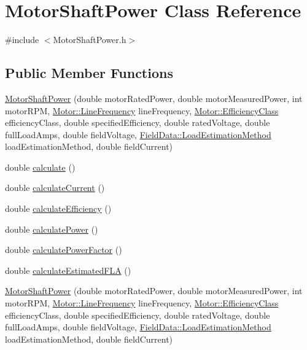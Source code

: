 \hypertarget{class_motor_shaft_power}{}\section{Motor\+Shaft\+Power Class Reference}
\label{class_motor_shaft_power}


{\ttfamily \#include $<$Motor\+Shaft\+Power.\+h$>$}

\subsection*{Public Member Functions}
\begin{DoxyCompactItemize}
\item 
\hyperlink{class_motor_shaft_power_a1695ae98d73b9813f2c049f627cc87f5}{Motor\+Shaft\+Power} (double motor\+Rated\+Power, double motor\+Measured\+Power, int motor\+R\+PM, \hyperlink{class_motor_acee1bdf1b684ad36cb80dc2829d9fcee}{Motor\+::\+Line\+Frequency} line\+Frequency, \hyperlink{class_motor_afa022971ae062406a9f588c601673d4e}{Motor\+::\+Efficiency\+Class} efficiency\+Class, double specified\+Efficiency, double rated\+Voltage, double full\+Load\+Amps, double field\+Voltage, \hyperlink{class_field_data_a424e89914ba5684c01bb269dbe3312fd}{Field\+Data\+::\+Load\+Estimation\+Method} load\+Estimation\+Method, double field\+Current)
\item 
double \hyperlink{class_motor_shaft_power_a65fc4f52753011c5a49376bc79bf81bc}{calculate} ()
\item 
double \hyperlink{class_motor_shaft_power_a3ce530d426fa14223199d89f54f34244}{calculate\+Current} ()
\item 
double \hyperlink{class_motor_shaft_power_ab7df0b41dc9d1bc6a591f0ab8f57b7ee}{calculate\+Efficiency} ()
\item 
double \hyperlink{class_motor_shaft_power_a4a2756922b290bec13550110aac25b8c}{calculate\+Power} ()
\item 
double \hyperlink{class_motor_shaft_power_aa7e9eb3a219c86f0ee0fb5b3d733b60a}{calculate\+Power\+Factor} ()
\item 
double \hyperlink{class_motor_shaft_power_a120b76be1b3b9fc3d67e37ecee0eb767}{calculate\+Estimated\+F\+LA} ()
\item 
\hyperlink{class_motor_shaft_power_a1695ae98d73b9813f2c049f627cc87f5}{Motor\+Shaft\+Power} (double motor\+Rated\+Power, double motor\+Measured\+Power, int motor\+R\+PM, \hyperlink{class_motor_acee1bdf1b684ad36cb80dc2829d9fcee}{Motor\+::\+Line\+Frequency} line\+Frequency, \hyperlink{class_motor_afa022971ae062406a9f588c601673d4e}{Motor\+::\+Efficiency\+Class} efficiency\+Class, double specified\+Efficiency, double rated\+Voltage, double full\+Load\+Amps, double field\+Voltage, \hyperlink{class_field_data_a424e89914ba5684c01bb269dbe3312fd}{Field\+Data\+::\+Load\+Estimation\+Method} load\+Estimation\+Method, double field\+Current)

\end{DoxyCompactItemize}
